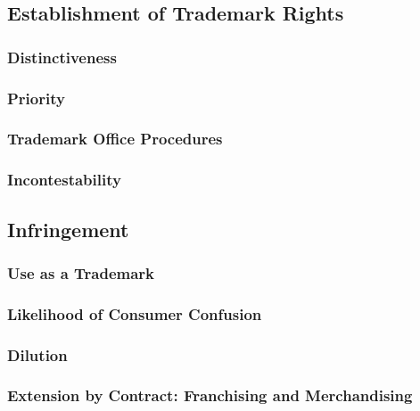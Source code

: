 
\subsection{Establishment of Trademark Rights}

\subsubsection{Distinctiveness}


\subsubsection{Priority}


\subsubsection{Trademark Office Procedures}


\subsubsection{Incontestability}


\subsection{Infringement}

\subsubsection{Use as a Trademark}


\subsubsection{Likelihood of Consumer Confusion}


\subsubsection{Dilution}


\subsubsection{Extension by Contract: Franchising and Merchandising}

